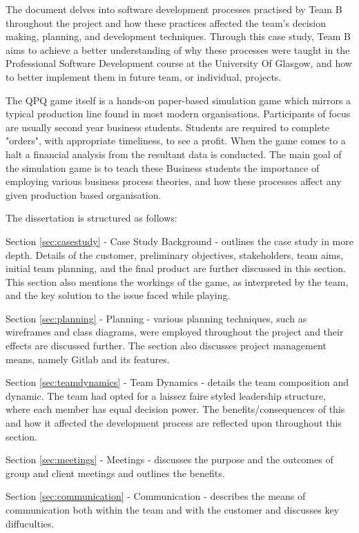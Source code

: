 \documentclass{l3proj}
\begin{document}
The document delves into software development processes practised by Team B throughout the project and how these practices affected the team's decision making, planning, and development techniques. Through this case study, Team B aims to achieve a better understanding of why these processes were taught in the Professional Software Development course at the University Of Glasgow, and how to better implement them in future team, or individual, projects.

The QPQ game itself is a hands-on paper-based simulation game which mirrors a typical production line found in most modern organisations. Participants of focus are usually second year business students. Students are required to complete "orders", with appropriate timeliness, to see a profit. When the game comes to a halt a financial analysis from the resultant data is conducted. The main goal of the simulation game is to teach these Business students the importance of employing various business process theories, and how these processes affect any given production based organisation.  

The dissertation is structured as follows:

Section \ref{sec:casestudy} - Case Study Background - outlines the case study in more depth. Details of the customer, preliminary objectives, stakeholders, team aims, initial team planning, and the final product are further discussed in this section. This section also mentions the workings of the game, as interpreted by the team, and the key solution to the issue faced while playing.

Section \ref{sec:planning} - Planning - various planning techniques, such as wireframes and class diagrams, were employed throughout the project and their effects are discussed further. The section also discusses project management means, namely Gitlab and its features.

Section \ref{sec:teamdynamics} -  Team Dynamics - details the team composition and dynamic. The team had opted for a laissez faire styled leadership structure, where each member has equal decision power. The benefits/consequences of this and how it affected the development process are reflected upon throughout this section.

Section \ref{sec:meetings} - Meetings - discusses the purpose and the outcomes of group and client meetings and outlines the benefits.

Section \ref{sec:communication} - Communication - describes the means of communication both within the team and with the customer and discusses key diffuculties.
\end{document}
